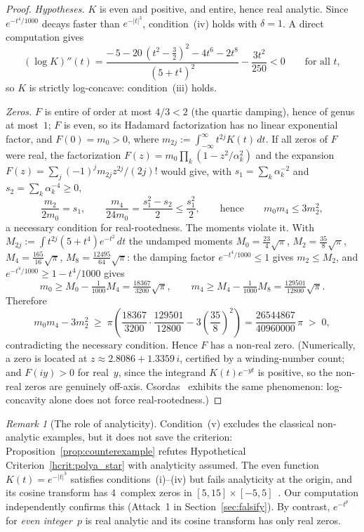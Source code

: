 \documentclass[11pt]{article}
\theoremstyle{definition}
\theoremstyle{remark}
\newtheorem{remark}[theorem]{Remark}
\begin{document}
\begin{proof}
\emph{Hypotheses.}
$K$ is even and positive, and entire, hence real analytic.
Since $e^{-t^4/1000}$ decays faster than $e^{-|t|^3}$, condition~(iv)
holds with $\delta = 1$.
A direct computation gives
\[
(\log K)''(t)
= \frac{-\,5 - 20\,(t^2 - \tfrac32)^2 - 4t^6 - 2t^8}{(5 + t^4)^2}
  - \frac{3t^2}{250} < 0
\qquad\text{for all } t,
\]
so $K$ is strictly log-concave: condition~(iii) holds.

\emph{Zeros.}
$F$ is entire of order at most $4/3 < 2$ (the quartic damping), hence of
genus at most~$1$; $F$ is even, so its Hadamard factorization has no
linear exponential factor, and $F(0) = m_0 > 0$, where
$m_{2j} := \int_{-\infty}^{\infty} t^{2j} K(t)\,dt$.
If all zeros of $F$ were real, the factorization
$F(z) = m_0 \prod_k (1 - z^2/\alpha_k^2)$ and the expansion
$F(z) = \sum_j (-1)^j m_{2j} z^{2j} / (2j)!$ would give, with
$s_1 = \sum_k \alpha_k^{-2}$ and $s_2 = \sum_k \alpha_k^{-4} \geq 0$,
\[
\frac{m_2}{2 m_0} = s_1,
\qquad
\frac{m_4}{24 m_0} = \frac{s_1^2 - s_2}{2} \leq \frac{s_1^2}{2},
\qquad\text{hence}\qquad
m_0 m_4 \leq 3 m_2^2,
\]
a necessary condition for real-rootedness.
The moments violate it.
With $M_{2j} := \int t^{2j} (5 + t^4) e^{-t^2}\,dt$ the undamped moments
$M_0 = \tfrac{23}{4}\sqrt{\pi}$, $M_2 = \tfrac{35}{8}\sqrt{\pi}$,
$M_4 = \tfrac{165}{16}\sqrt{\pi}$, $M_8 = \tfrac{12495}{64}\sqrt{\pi}$:
the damping factor $e^{-t^4/1000} \leq 1$ gives
$m_2 \leq M_2$, and $e^{-t^4/1000} \geq 1 - t^4/1000$ gives
\[
m_0 \geq M_0 - \tfrac{1}{1000} M_4 = \tfrac{18367}{3200}\sqrt{\pi},
\qquad
m_4 \geq M_4 - \tfrac{1}{1000} M_8 = \tfrac{129501}{12800}\sqrt{\pi}.
\]
Therefore
\[
m_0 m_4 - 3 m_2^2
\;\geq\;
\pi\left(\frac{18367}{3200}\cdot\frac{129501}{12800}
- 3\left(\frac{35}{8}\right)^2\right)
= \frac{26544867}{40960000}\,\pi \;>\; 0,
\]
contradicting the necessary condition.
Hence $F$ has a non-real zero.
(Numerically, a zero is located at $z \approx 2.8086 + 1.3359\,i$,
certified by a winding-number count; and $F(iy) > 0$ for real~$y$,
since the integrand $K(t)e^{-yt}$ is positive, so the non-real zeros
are genuinely off-axis.
Csordas~\cite[Example~3.12]{csordas2015} exhibits the same phenomenon:
log-concavity alone does not force real-rootedness.)
\end{proof}

\begin{remark}[The role of analyticity]
Condition~(v) excludes the classical non-analytic examples, but it does
not save the criterion: Proposition~\ref{prop:counterexample} refutes
Hypothetical Criterion~\ref{hcrit:polya_star} with analyticity assumed.
The even function $K(t) = e^{-|t|^3}$ satisfies conditions~(i)--(iv) but
fails analyticity at the origin, and its cosine transform has 4~complex zeros
in $[5,15]\times[-5,5]$~\cite[Ex.~2.1]{csordas1989}.
Our computation independently confirms this (Attack~1 in Section~\ref{sec:falsify}).
By contrast, $e^{-t^p}$ for \emph{even integer}~$p$ is real analytic and its cosine
transform has only real zeros.
\end{remark}
\end{document}

